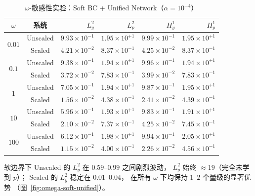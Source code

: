 \documentclass[UTF8, 12pt]{ctexart}
\begin{document}
\begin{table}[H]
  \centering
  \caption{$\omega$-敏感性实验：Soft BC + Unified Network（$\alpha=10^{-4}$）}
  \label{tab:omega-soft-unified}
  \small
  \begin{tabular}{cc rrrr}
    \toprule
    $\omega$ & 系统 & $L^2_y$ & $L^2_p$ & $H^1_y$ & $H^1_p$ \\
    \midrule
    \multirow{2}{*}{$0.01$}
      & Unscaled & $9.93\times10^{-1}$ & $1.95\times10^{+1}$
                 & $9.99\times10^{-1}$ & $1.95\times10^{+1}$ \\
      & Scaled   & $4.21\times10^{-2}$ & $8.37\times10^{-1}$
                 & $4.25\times10^{-2}$ & $8.37\times10^{-1}$ \\
    \midrule
    \multirow{2}{*}{$0.1$}
      & Unscaled & $9.38\times10^{-1}$ & $1.94\times10^{+1}$
                 & $9.96\times10^{-1}$ & $1.94\times10^{+1}$ \\
      & Scaled   & $3.72\times10^{-2}$ & $7.83\times10^{-1}$
                 & $3.99\times10^{-2}$ & $7.83\times10^{-1}$ \\
    \midrule
    \multirow{2}{*}{$1$}
      & Unscaled & $7.05\times10^{-1}$ & $1.94\times10^{+1}$
                 & $9.87\times10^{-1}$ & $1.95\times10^{+1}$ \\
      & Scaled   & $1.56\times10^{-2}$ & $4.38\times10^{-1}$
                 & $2.41\times10^{-2}$ & $4.39\times10^{-1}$ \\
    \midrule
    \multirow{2}{*}{$10$}
      & Unscaled & $5.96\times10^{-1}$ & $1.93\times10^{+1}$
                 & $9.83\times10^{-1}$ & $1.91\times10^{+1}$ \\
      & Scaled   & $2.10\times10^{-2}$ & $7.37\times10^{-1}$
                 & $4.25\times10^{-2}$ & $7.45\times10^{-1}$ \\
    \midrule
    \multirow{2}{*}{$100$}
      & Unscaled & $6.12\times10^{-1}$ & $1.98\times10^{+1}$
                 & $9.94\times10^{-1}$ & $2.05\times10^{+1}$ \\
      & Scaled   & $1.15\times10^{-2}$ & $4.00\times10^{-1}$
                 & $2.26\times10^{-2}$ & $4.56\times10^{-1}$ \\
    \bottomrule
  \end{tabular}
\end{table}

软边界下 Unscaled 的 $L^2_y$ 在 $0.59$--$0.99$ 之间剧烈波动，
$L^2_p$ 始终 $\approx 19$（完全未学到 $\bar{p}$）；
Scaled 的 $L^2_y$ 稳定在 $0.01$--$0.04$，
在所有 $\omega$ 下均保持 $1$--$2$ 个量级的显著优势
（图~\ref{fig:omega-soft-unified}）。
\end{document}
